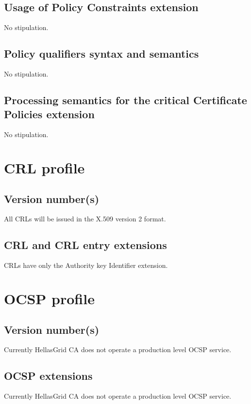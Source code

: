 \subsection{Usage of Policy Constraints extension}

No stipulation.

\subsection{Policy qualifiers syntax and semantics}

No stipulation.

\subsection{Processing semantics for the critical Certificate Policies extension}

No stipulation.

\section{CRL profile}
\subsection{Version number(s)}

All CRLs will be issued in the X.509 version 2 format.

\subsection{CRL and CRL entry extensions}

CRLs have only the Authority key Identifier extension.

\section{OCSP profile}

\subsection{Version number(s)}

Currently HellasGrid CA does not operate a production level OCSP service.

\subsection{OCSP extensions}

Currently HellasGrid CA does not operate a production level OCSP service.

